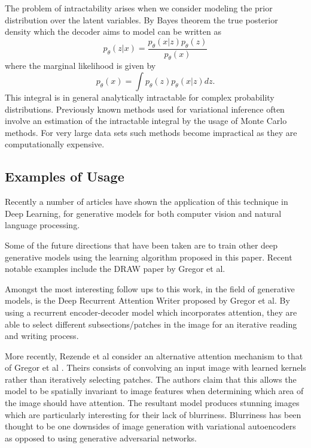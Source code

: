 \documentclass[a4paper,12pt]{article}
\begin{document}
The problem of intractability arises when we consider modeling the prior distribution over the latent variables. 
By Bayes theorem the true posterior density which the decoder aims to model can be written as
\begin{equation}
p_{\theta}(z \vert x) = \dfrac{p_\theta(x \vert z)p_\theta(z)}{p_\theta(x)}
\end{equation}
where the marginal likelihood is given by
\[p_{\theta}(x) = \int p_{\theta}(z)p_{\theta}(x\vert z) dz.\]
This integral is in general analytically intractable for complex probability distributions.
Previously known methods used for variational inference often involve an estimation of the intractable integral by the usage of Monte Carlo methods. For very large data sets such methods become impractical as they are computationally expensive. 

\subsection{Examples of Usage}
Recently a number of articles have shown the application of this technique in Deep Learning, for generative models for both computer vision and natural language processing.

Some of the future directions that have been taken are to train other deep generative models using the learning algorithm proposed in this paper. Recent notable examples include the DRAW paper by Gregor et al.

Amongst the most interesting follow ups to this work, in the field of generative models, is the Deep Recurrent Attention Writer proposed by Gregor et al. By using a recurrent encoder-decoder model which incorporates attention, they are able to select different subsections/patches in the image for an iterative reading and writing process.

More recently, Rezende et al consider an alternative attention mechanism to that of Gregor et al . Theirs consists of convolving an input image with learned kernels rather than iteratively selecting patches. The authors claim that this allows the model to be spatially invariant to image features when determining which area of the image should have attention. The resultant model produces stunning images which are particularly  interesting for their lack of blurriness. Blurriness has been thought to be one downsides of image generation with variational autoencoders as opposed to using generative adversarial networks.
\end{document}
